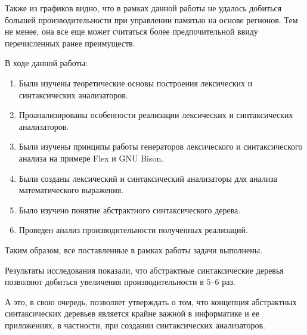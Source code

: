 \documentclass[bachelor, och, otchet]{SCWorks}
\begin{document}
Также из графиков видно, что в рамках данной работы не удалось добиться большей производительности при управлении памятью на основе регионов. Тем не менее, она все еще может считаться более предпочительной ввиду перечисленных ранее преимуществ.

\conclusion

В ходе данной работы:

\begin{enumerate}
    \item Были изучены теоретические основы построения лексических и синтаксических анализаторов.
    \item Проанализированы особенности реализации лексических и синтаксических анализаторов.
    \item Были изучены принципы работы генераторов лексического и синтаксического анализа на примере Flex и GNU Bison.
    \item Были созданы лексический и синтаксический анализаторы для анализа математического выражения.
    \item Было изучено понятие абстрактного синтаксического дерева.
    \item Проведен анализ производительности полученных реализаций.
\end{enumerate}

Таким образом, все поставленные в рамках работы задачи выполнены.

Результаты исследования показали, что абстрактные синтаксические деревья позволяют добиться увеличения производительности в $5$--$6$ раз.

А это, в свою очередь, позволяет утверждать о том, что концепция абстрактных синтаксических деревьев является крайне важной в информатике и ее приложениях, в частности, при создании синтаксических анализаторов.

%

%





\appendix 
\end{document}
